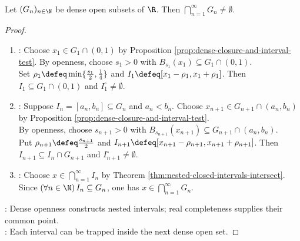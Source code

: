\begin{theorem} \label{thm:dense-open-baire-real-line} \\
Let $(G_n)_{n\in\N}$ be dense open subsets of $\R$. Then $\bigcap\limits_{n=1}^{\infty}G_n\ne\emptyset$.
\begin{proof}
\begin{enumerate}[label=(\roman*)]
\setlength{\itemsep}{0pt}
\item {}: Choose $x_1\in G_1\cap(0,1)$ by Proposition \ref{prop:dense-closure-and-interval-test}. By openness, choose $s_1>0$ with $B_{s_1}(x_1)\subseteq G_1\cap(0,1)$.\\
Set $\rho_1\defeq\min\{\frac{s_1}{2},\frac{1}{4}\}$ and $I_1\defeq[x_1-\rho_1,x_1+\rho_1]$. Then $I_1\subseteq G_1\cap(0,1)$ and $I_1^\circ\ne\emptyset$.
\item {}: Suppose $I_n=[a_n,b_n]\subseteq G_n$ and $a_n<b_n$. Choose $x_{n+1}\in G_{n+1}\cap(a_n,b_n)$ by Proposition \ref{prop:dense-closure-and-interval-test}.\\
By openness, choose $s_{n+1}>0$ with $B_{s_{n+1}}(x_{n+1})\subseteq G_{n+1}\cap(a_n,b_n)$.\\
Put $\rho_{n+1}\defeq\frac{s_{n+1}}{2}$ and $I_{n+1}\defeq[x_{n+1}-\rho_{n+1},x_{n+1}+\rho_{n+1}]$. Then $I_{n+1}\subseteq I_n\cap G_{n+1}$ and $I_{n+1}^\circ\ne\emptyset$.
\item {}: Choose $x\in\bigcap\limits_{n=1}^{\infty}I_n$ by Theorem \ref{thm:nested-closed-intervals-intersect}. Since $(\forall n\in\N)\,I_n\subseteq G_n$, one has $x\in\bigcap\limits_{n=1}^{\infty}G_n$.
\end{enumerate}
: Dense openness constructs nested intervals; real completeness supplies their common point.\\
: Each interval can be trapped inside the next dense open set.
\end{proof}
\end{theorem}

